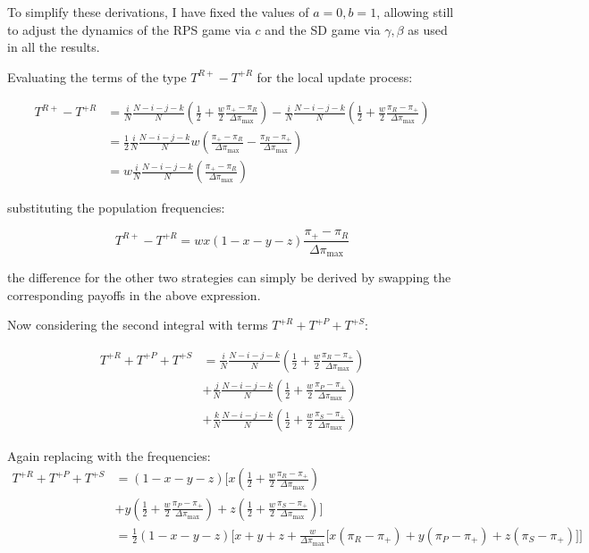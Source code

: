 \documentclass[./main.tex]{subfiles}
\begin{document}
To simplify these derivations, I have fixed the values of $a = 0, b=1$, allowing
still to adjust the dynamics of the RPS game via $c$ and the SD game via $\gamma, \beta$
as used in all the results.

Evaluating the terms of the type $T^{R+} - T^{+R}$ for the local update process:

\begin{align}
T^{R+} - T^{+R} &= \frac{i}{N}\frac{N-i-j-k}{N}\left(\frac{1}{2} + \frac{w}{2}\frac{\pi_+ - \pi_R}{\Delta \pi_{\text{max}}}\right) - \frac{i}{N}\frac{N-i-j-k}{N}\left(\frac{1}{2} + \frac{w}{2}\frac{\pi_R - \pi_+}{\Delta \pi_{\text{max}}}\right) \nonumber \\
&= \frac{1}{2}\frac{i}{N}\frac{N-i-j-k}{N}w\left(\frac{\pi_+ - \pi_R}{\Delta \pi_{\text{max}}} 
- \frac{\pi_R - \pi_+}{\Delta \pi_{\text{max}}}\right)\nonumber \\
 &= w\frac{i}{N}\frac{N-i-j-k}{N}\left(\frac{\pi_+ - \pi_R}{\Delta \pi_{\text{max}}}\right)\nonumber
\end{align}

substituting the population frequencies:

\begin{equation}
T^{R+} - T^{+R} = wx(1-x-y-z)\frac{\pi_+ - \pi_R}{\Delta \pi_{\text{max}}}
\end{equation}

the difference for the other two strategies can simply be derived by swapping the corresponding
payoffs in the above expression.

Now considering the second integral with terms $T^{+R} + T^{+P} + T^{+S}$:

\begin{align}
T^{+R} + T^{+P} + T^{+S} &= \frac{i}{N}\frac{N-i-j-k}{N}\left(\frac{1}{2} 
+ \frac{w}{2}\frac{\pi_R - \pi_+}{\Delta \pi_{\text{max}}}\right) \nonumber\\
&+ \frac{j}{N}\frac{N-i-j-k}{N}\left(\frac{1}{2}
 + \frac{w}{2}\frac{\pi_P - \pi_+}{\Delta \pi_{\text{max}}}\right)\nonumber \\
 &+ \frac{k}{N}\frac{N-i-j-k}{N}\left(\frac{1}{2}
 + \frac{w}{2}\frac{\pi_S - \pi_+}{\Delta \pi_{\text{max}}}\right)\nonumber
\end{align}

Again replacing with the frequencies:
\begin{align}
T^{+R} + T^{+P} + T^{+S} &= (1-x-y-z) \Bigg[ x\left(\frac{1}{2} 
+ \frac{w}{2}\frac{\pi_R - \pi_+}{\Delta \pi_{\text{max}}}\right)\nonumber \\
&+ y\left(\frac{1}{2}
 + \frac{w}{2}\frac{\pi_P - \pi_+}{\Delta \pi_{\text{max}}}\right) 
 + z\left(\frac{1}{2}
 + \frac{w}{2}\frac{\pi_S - \pi_+}{\Delta \pi_{\text{max}}}\right) \Bigg]\nonumber \\
&= \frac{1}{2}(1-x-y-z)\Bigg[x + y + z + \frac{w}{\Delta \pi_{\text{max}}}
\Big[x(\pi_R - \pi_+) + y(\pi_P - \pi_+) + z(\pi_S - \pi_+)\Big]\nonumber
\Bigg]
\end{align}
\end{document}
